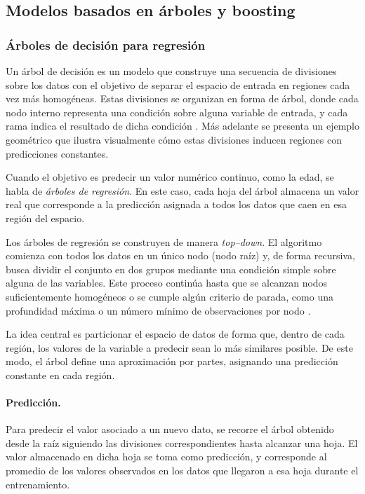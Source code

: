 \subsection{Modelos basados en árboles y boosting}

\subsubsection{Árboles de decisión para regresión}

Un árbol de decisión es un modelo que construye una secuencia de divisiones
sobre los datos con el objetivo de separar el espacio de entrada en regiones
cada vez más homogéneas. Estas divisiones se organizan en forma de árbol,
donde cada nodo interno representa una condición sobre alguna variable de
entrada, y cada rama indica el resultado de dicha condición
\cite{breiman2017classification, loh2011classification}. Más adelante se
presenta un ejemplo geométrico que ilustra visualmente cómo estas divisiones
inducen regiones con predicciones constantes.

Cuando el objetivo es predecir un valor numérico continuo, como la edad,
se habla de \textit{árboles de regresión}. En este caso, cada hoja del árbol
almacena un valor real que corresponde a la predicción asignada a todos los
datos que caen en esa región del espacio.

Los árboles de regresión se construyen de manera \textit{top--down}. El
algoritmo comienza con todos los datos en un único nodo (nodo raíz) y, de
forma recursiva, busca dividir el conjunto en dos grupos mediante una
condición simple sobre alguna de las variables. Este proceso continúa hasta
que se alcanzan nodos suficientemente homogéneos o se cumple algún criterio
de parada, como una profundidad máxima o un número mínimo de observaciones
por nodo \cite{loh2011classification}.

La idea central es particionar el espacio de datos de forma que, dentro de
cada región, los valores de la variable a predecir sean lo más similares
posible. De este modo, el árbol define una aproximación por partes,
asignando una predicción constante en cada región.

\paragraph{Predicción.}
Para predecir el valor asociado a un nuevo dato, se recorre el árbol obtenido desde la
raíz siguiendo las divisiones correspondientes hasta alcanzar una hoja. El
valor almacenado en dicha hoja se toma como predicción, y corresponde al
promedio de los valores observados en los datos que llegaron a esa hoja
durante el entrenamiento.

